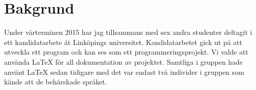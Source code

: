 \section{Bakgrund}
Under vårterminen 2015 har jag tillsammans med sex andra studenter deltagit i ett kandidatarbete åt Linköpings universitet. Kandidatarbetet gick ut på att utveckla ett program och kan ses som ett programmeringsprojekt. Vi valde att använda {\LaTeX} för all dokumentation av projektet. Samtliga i gruppen hade använt {\LaTeX} sedan tidigare med det var endast två individer i gruppen som kände att de behärskade språket.   
